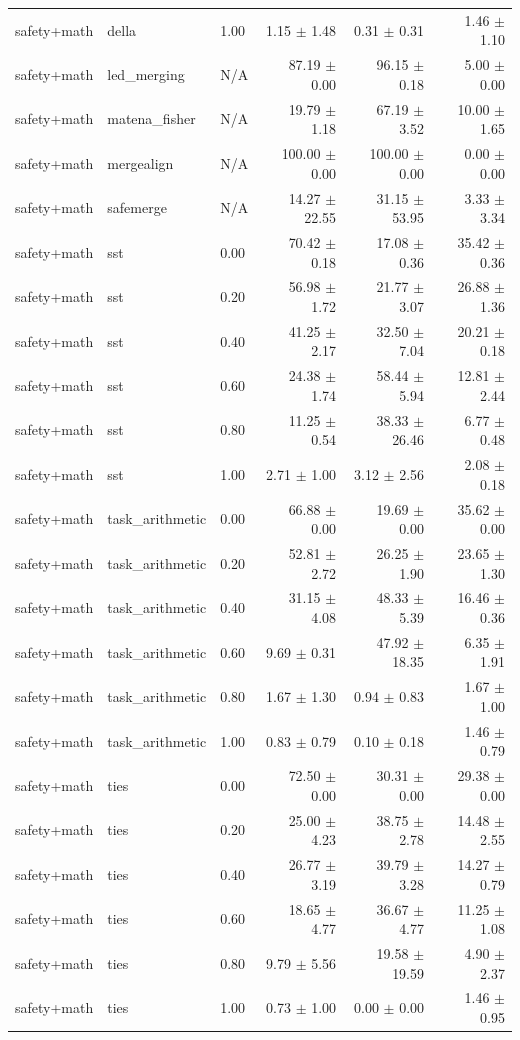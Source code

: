 \begin{table}[H]
{\begin{tabular}{lllrrr}
safety+math & della & 1.00 & 1.15 $\pm$ 1.48 & 0.31 $\pm$ 0.31 & 1.46 $\pm$ 1.10 \\
safety+math & led\_merging & N/A & 87.19 $\pm$ 0.00 & 96.15 $\pm$ 0.18 & 5.00 $\pm$ 0.00 \\
safety+math & matena\_fisher & N/A & 19.79 $\pm$ 1.18 & 67.19 $\pm$ 3.52 & 10.00 $\pm$ 1.65 \\
safety+math & mergealign & N/A & 100.00 $\pm$ 0.00 & 100.00 $\pm$ 0.00 & 0.00 $\pm$ 0.00 \\
safety+math & safemerge & N/A & 14.27 $\pm$ 22.55 & 31.15 $\pm$ 53.95 & 3.33 $\pm$ 3.34 \\
safety+math & sst & 0.00 & 70.42 $\pm$ 0.18 & 17.08 $\pm$ 0.36 & 35.42 $\pm$ 0.36 \\
safety+math & sst & 0.20 & 56.98 $\pm$ 1.72 & 21.77 $\pm$ 3.07 & 26.88 $\pm$ 1.36 \\
safety+math & sst & 0.40 & 41.25 $\pm$ 2.17 & 32.50 $\pm$ 7.04 & 20.21 $\pm$ 0.18 \\
safety+math & sst & 0.60 & 24.38 $\pm$ 1.74 & 58.44 $\pm$ 5.94 & 12.81 $\pm$ 2.44 \\
safety+math & sst & 0.80 & 11.25 $\pm$ 0.54 & 38.33 $\pm$ 26.46 & 6.77 $\pm$ 0.48 \\
safety+math & sst & 1.00 & 2.71 $\pm$ 1.00 & 3.12 $\pm$ 2.56 & 2.08 $\pm$ 0.18 \\
safety+math & task\_arithmetic & 0.00 & 66.88 $\pm$ 0.00 & 19.69 $\pm$ 0.00 & 35.62 $\pm$ 0.00 \\
safety+math & task\_arithmetic & 0.20 & 52.81 $\pm$ 2.72 & 26.25 $\pm$ 1.90 & 23.65 $\pm$ 1.30 \\
safety+math & task\_arithmetic & 0.40 & 31.15 $\pm$ 4.08 & 48.33 $\pm$ 5.39 & 16.46 $\pm$ 0.36 \\
safety+math & task\_arithmetic & 0.60 & 9.69 $\pm$ 0.31 & 47.92 $\pm$ 18.35 & 6.35 $\pm$ 1.91 \\
safety+math & task\_arithmetic & 0.80 & 1.67 $\pm$ 1.30 & 0.94 $\pm$ 0.83 & 1.67 $\pm$ 1.00 \\
safety+math & task\_arithmetic & 1.00 & 0.83 $\pm$ 0.79 & 0.10 $\pm$ 0.18 & 1.46 $\pm$ 0.79 \\
safety+math & ties & 0.00 & 72.50 $\pm$ 0.00 & 30.31 $\pm$ 0.00 & 29.38 $\pm$ 0.00 \\
safety+math & ties & 0.20 & 25.00 $\pm$ 4.23 & 38.75 $\pm$ 2.78 & 14.48 $\pm$ 2.55 \\
safety+math & ties & 0.40 & 26.77 $\pm$ 3.19 & 39.79 $\pm$ 3.28 & 14.27 $\pm$ 0.79 \\
safety+math & ties & 0.60 & 18.65 $\pm$ 4.77 & 36.67 $\pm$ 4.77 & 11.25 $\pm$ 1.08 \\
safety+math & ties & 0.80 & 9.79 $\pm$ 5.56 & 19.58 $\pm$ 19.59 & 4.90 $\pm$ 2.37 \\
safety+math & ties & 1.00 & 0.73 $\pm$ 1.00 & 0.00 $\pm$ 0.00 & 1.46 $\pm$ 0.95 \\
\bottomrule
\end{tabular}
}
\end{table}